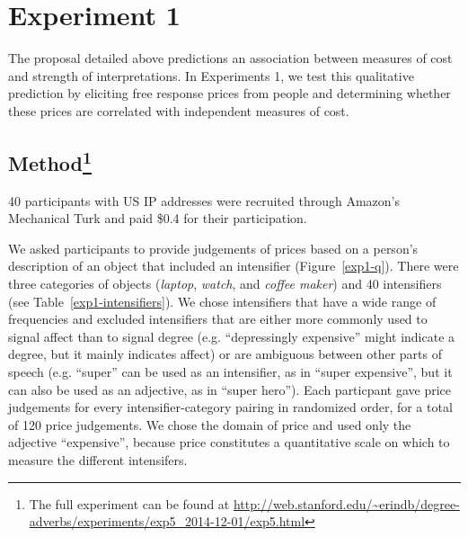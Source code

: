 \documentclass[10pt,letterpaper]{article}
\begin{document}
\section{Experiment 1}

The proposal detailed above predictions an association between measures of cost and strength of interpretations. In Experiments 1, we test this qualitative prediction%
by eliciting free response prices from people and determining whether these prices are correlated with independent measures of cost.

\subsection{Method\footnote{The full experiment can be found at \url{http://web.stanford.edu/~erindb/degree-adverbs/experiments/exp5_2014-12-01/exp5.html}}}

40 participants with US IP addresses were recruited through Amazon's Mechanical Turk and paid \$0.4 for their participation.

We asked participants to provide judgements of prices based on a person's description of an object that included an intensifier (Figure~\ref{exp1-q}).
There were three categories of objects (\emph{laptop}, \emph{watch}, and \emph{coffee maker}) and 40 intensifiers (see Table~\ref{exp1-intensifiers}).
We chose intensifiers that have a wide range of frequencies and excluded intensifiers that are either more commonly used to signal affect than to signal degree (e.g. ``depressingly expensive'' might indicate a degree, but it mainly indicates affect) or are ambiguous between other parts of speech (e.g. ``super'' can be used as an intensifier, as in ``super expensive'', but it can also be used as an adjective, as in ``super hero'').
Each particpant gave price judgements for every intensifier-category pairing in randomized order, for a total of 120 price judgements.
We chose the domain of price and used only the adjective ``expensive'', because price constitutes a quantitative scale on which to measure the different intensifers.%
\end{document}
